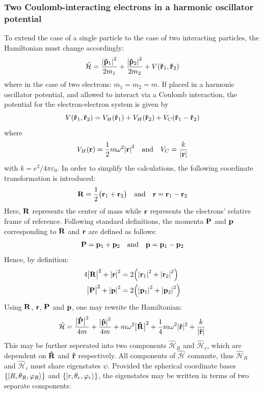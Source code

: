 \documentclass[reprint,english]{revtex4-1}
\newcommand{\Ham}{\hat{\mathcal{H}}}
\begin{document}
\subsubsection{Two Coulomb-interacting electrons in a harmonic oscillator potential}
To extend the case of a single particle to the case of two interacting particles, the Hamiltonian must change accordingly:
\begin{equation}\label{eq:hamiltonian_two_particles}
\Ham=\frac{\abs{\vu{p}_1}^2}{2m_1}+\frac{\abs{\vu{p}_2}^2}{2m_2}+V(\vu{r}_1,\vu{r}_2)
\end{equation}
where in the case of two electrons: \(m_1=m_2=m\). If placed in a harmonic oscillator potential, and allowed to interact via a Coulomb interaction, the potential for the electron-electron system is given by
\begin{equation}
V(\vu{r}_1,\vu{r}_2)=V_H(\vu{r}_1)+V_H(\vu{r}_2)+V_C(\vu{r}_1-\vu{r}_2)
\end{equation}
where
\[V_H(\vb{r})=\frac{1}{2}m\omega^2\abs{\vb{r}}^2\qand V_C=\frac{k}{\abs{\vb{r}}}\]
with \(k=e^2/4\pi\varepsilon_0\). In order to simplify the calculations, the following coordinate transformation is introduced:
\begin{equation}
\vb{R}=\frac{1}{2}\big(\vb{r}_1+\vb{r}_2\big)\qand\vb{r}=\vb{r}_1-\vb{r}_2
\end{equation}
Here, \(\vb{R}\) represents the center of mass while \(\vb{r}\) represents the electrons' relative frame of reference. Following standard definitions, the momenta \(\vb{P}\) and \(\vb{p}\) corresponding to \(\vb{R}\) and \(\vb{r}\) are defined as follows:
\begin{equation}
\vb{P}=\vb{p}_1+\vb{p}_2\qand\vb{p}=\vb{p}_1-\vb{p}_2
\end{equation}
Hence, by definition:
\begin{align*}
4\big|\vb{R}\big|^2+\abs{\vb{r}}^2&=2\Big(\abs{\vb{r}_1}^2+\abs{\vb{r}_2}^2\Big)\\
\big|\vb{P}\big|^2+\abs{\vb{p}}^2&=2\Big(\abs{\vb{p}_1}^2+\abs{\vb{p}_2}^2\Big)
\end{align*}
Using \(\vb{R}\), \(\vb{r}\), \(\vb{P}\) and \(\vb{p}\), one may rewrite the Hamiltonian:
\begin{equation}\label{eq:hamiltonian_two_particles_new}
\Ham=\frac{\big|\vu{P}\big|^2}{4m}+\frac{\abs{\vu{p}}^2}{4m}+m\omega^2\big|\vu{R}\big|^2+\frac{1}{4}m\omega^2|\vu{r}|^2+\frac{k}{|\vu{r}|}
\end{equation}
This may be further seperated into two components \(\Ham_R\) and \(\Ham_r\), which are dependent on \(\vu{R}\) and \(\vu{r}\) respectively. All components of \(\Ham\) commute, thus \(\Ham_R\) and \(\Ham_r\) must share eigenstates \(\psi\). Provided the spherical coordinate bases \(\{\ket{R,\theta_R,\varphi_R}\}\) and \(\{\ket{r,\theta_r,\varphi_r}\}\), the eigenstates may be written in terms of two separate components:
\end{document}
